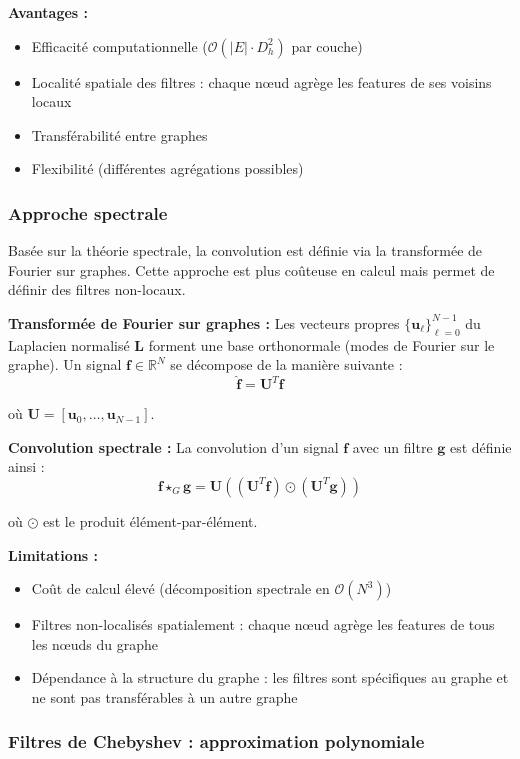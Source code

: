 \textbf{Avantages :}
\begin{itemize}
    \item Efficacité computationnelle ($\mathcal{O}(|E| \cdot D_h^2)$ par couche)
    \item Localité spatiale des filtres : chaque nœud agrège les features de ses voisins locaux
    \item Transférabilité entre graphes
    \item Flexibilité (différentes agrégations possibles)
\end{itemize}

\subsubsection{Approche spectrale}

Basée sur la théorie spectrale, la convolution est définie via la transformée de Fourier sur graphes. Cette approche est plus coûteuse en calcul mais permet de définir des filtres non-locaux.

\textbf{Transformée de Fourier sur graphes :}
Les vecteurs propres $\{\mathbf{u}_\ell\}_{\ell=0}^{N-1}$ du Laplacien normalisé $\mathbf{L}$ forment une base orthonormale (modes de Fourier sur le graphe). Un signal $\mathbf{f} \in \mathbb{R}^N$ se décompose de la manière suivante :
\[
\hat{\mathbf{f}} = \mathbf{U}^T \mathbf{f}
\]

où $\mathbf{U} = [\mathbf{u}_0, \ldots, \mathbf{u}_{N-1}]$.

\textbf{Convolution spectrale :}
La convolution d'un signal $\mathbf{f}$ avec un filtre $\mathbf{g}$ est définie ainsi :
\[
\mathbf{f} \star_G \mathbf{g} = \mathbf{U} \left((\mathbf{U}^T \mathbf{f}) \odot (\mathbf{U}^T \mathbf{g})\right)
\]

où $\odot$ est le produit élément-par-élément.

\textbf{Limitations :}
\begin{itemize}
    \item Coût de calcul élevé (décomposition spectrale en $\mathcal{O}(N^3)$)
    \item Filtres non-localisés spatialement : chaque nœud agrège les features de tous les nœuds du graphe
    \item Dépendance à la structure du graphe : les filtres sont spécifiques au graphe et ne sont pas transférables à un autre graphe
\end{itemize}

\subsubsection{Filtres de Chebyshev : approximation polynomiale}

